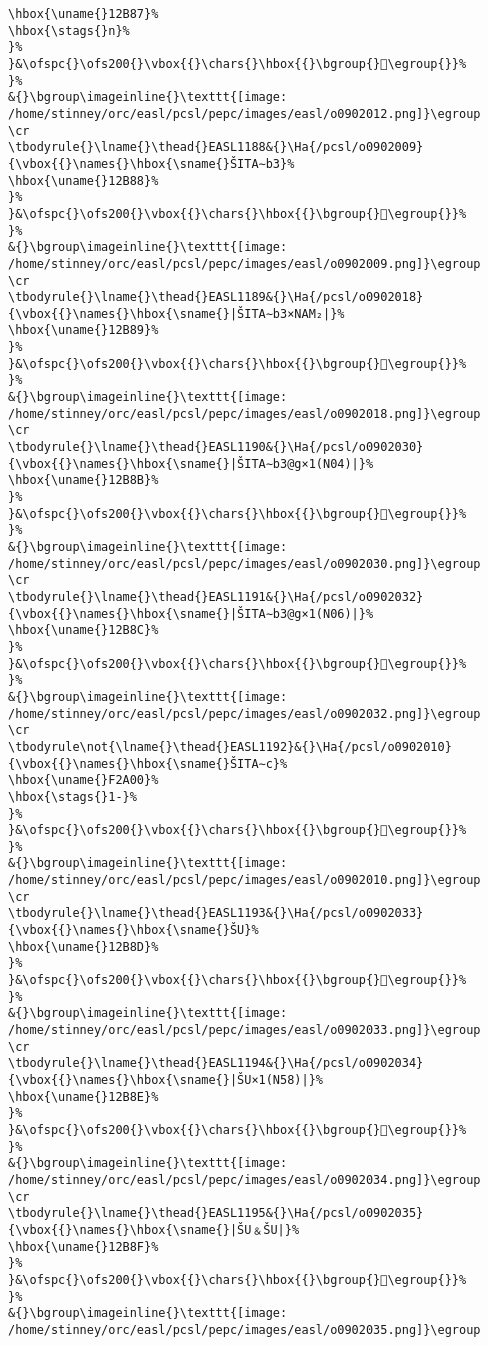 \begin{verbatim}
\hbox{\uname{}12B87}%
\hbox{\stags{}n}%
}%
}&\ofspc{}\ofs200{}\vbox{{}\chars{}\hbox{{}\bgroup{}𒮇\egroup{}}%
}%
&{}\bgroup\imageinline{}\texttt{[image: /home/stinney/orc/easl/pcsl/pepc/images/easl/o0902012.png]}\egroup
\cr
\tbodyrule{}\lname{}\thead{}EASL1188&{}\Ha{/pcsl/o0902009}{\vbox{{}\names{}\hbox{\sname{}ŠITA∼b3}%
\hbox{\uname{}12B88}%
}%
}&\ofspc{}\ofs200{}\vbox{{}\chars{}\hbox{{}\bgroup{}𒮈\egroup{}}%
}%
&{}\bgroup\imageinline{}\texttt{[image: /home/stinney/orc/easl/pcsl/pepc/images/easl/o0902009.png]}\egroup
\cr
\tbodyrule{}\lname{}\thead{}EASL1189&{}\Ha{/pcsl/o0902018}{\vbox{{}\names{}\hbox{\sname{}|ŠITA∼b3×NAM₂|}%
\hbox{\uname{}12B89}%
}%
}&\ofspc{}\ofs200{}\vbox{{}\chars{}\hbox{{}\bgroup{}𒮉\egroup{}}%
}%
&{}\bgroup\imageinline{}\texttt{[image: /home/stinney/orc/easl/pcsl/pepc/images/easl/o0902018.png]}\egroup
\cr
\tbodyrule{}\lname{}\thead{}EASL1190&{}\Ha{/pcsl/o0902030}{\vbox{{}\names{}\hbox{\sname{}|ŠITA∼b3@g×1(N04)|}%
\hbox{\uname{}12B8B}%
}%
}&\ofspc{}\ofs200{}\vbox{{}\chars{}\hbox{{}\bgroup{}𒮋\egroup{}}%
}%
&{}\bgroup\imageinline{}\texttt{[image: /home/stinney/orc/easl/pcsl/pepc/images/easl/o0902030.png]}\egroup
\cr
\tbodyrule{}\lname{}\thead{}EASL1191&{}\Ha{/pcsl/o0902032}{\vbox{{}\names{}\hbox{\sname{}|ŠITA∼b3@g×1(N06)|}%
\hbox{\uname{}12B8C}%
}%
}&\ofspc{}\ofs200{}\vbox{{}\chars{}\hbox{{}\bgroup{}𒮌\egroup{}}%
}%
&{}\bgroup\imageinline{}\texttt{[image: /home/stinney/orc/easl/pcsl/pepc/images/easl/o0902032.png]}\egroup
\cr
\tbodyrule\not{\lname{}\thead{}EASL1192}&{}\Ha{/pcsl/o0902010}{\vbox{{}\names{}\hbox{\sname{}ŠITA∼c}%
\hbox{\uname{}F2A00}%
\hbox{\stags{}1-}%
}%
}&\ofspc{}\ofs200{}\vbox{{}\chars{}\hbox{{}\bgroup{}󲨀\egroup{}}%
}%
&{}\bgroup\imageinline{}\texttt{[image: /home/stinney/orc/easl/pcsl/pepc/images/easl/o0902010.png]}\egroup
\cr
\tbodyrule{}\lname{}\thead{}EASL1193&{}\Ha{/pcsl/o0902033}{\vbox{{}\names{}\hbox{\sname{}ŠU}%
\hbox{\uname{}12B8D}%
}%
}&\ofspc{}\ofs200{}\vbox{{}\chars{}\hbox{{}\bgroup{}𒮍\egroup{}}%
}%
&{}\bgroup\imageinline{}\texttt{[image: /home/stinney/orc/easl/pcsl/pepc/images/easl/o0902033.png]}\egroup
\cr
\tbodyrule{}\lname{}\thead{}EASL1194&{}\Ha{/pcsl/o0902034}{\vbox{{}\names{}\hbox{\sname{}|ŠU×1(N58)|}%
\hbox{\uname{}12B8E}%
}%
}&\ofspc{}\ofs200{}\vbox{{}\chars{}\hbox{{}\bgroup{}𒮎\egroup{}}%
}%
&{}\bgroup\imageinline{}\texttt{[image: /home/stinney/orc/easl/pcsl/pepc/images/easl/o0902034.png]}\egroup
\cr
\tbodyrule{}\lname{}\thead{}EASL1195&{}\Ha{/pcsl/o0902035}{\vbox{{}\names{}\hbox{\sname{}|ŠU﹠ŠU|}%
\hbox{\uname{}12B8F}%
}%
}&\ofspc{}\ofs200{}\vbox{{}\chars{}\hbox{{}\bgroup{}𒮏\egroup{}}%
}%
&{}\bgroup\imageinline{}\texttt{[image: /home/stinney/orc/easl/pcsl/pepc/images/easl/o0902035.png]}\egroup

\end{verbatim}
